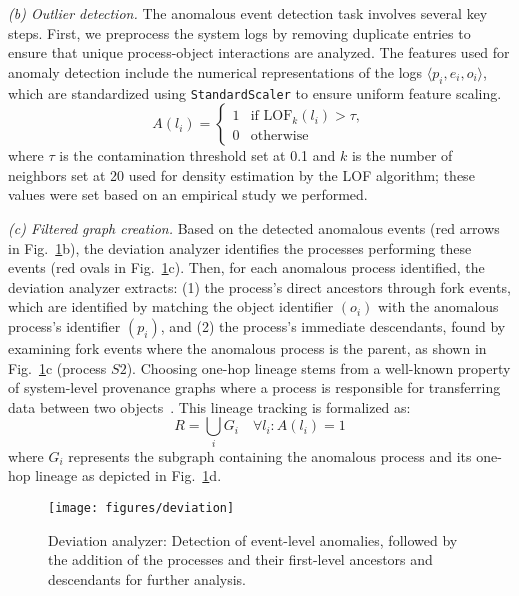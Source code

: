 \noindent\textit{(b) Outlier detection.} The anomalous event detection task involves several key steps. 
First, we preprocess the system logs by removing duplicate entries to ensure that unique process-object interactions are analyzed. 
The features used for anomaly detection include the numerical representations of the logs $\langle p_i, e_i, o_i \rangle$, which are standardized using \texttt{StandardScaler} to ensure uniform feature scaling.
\begin{equation}
A(l_i) =
\begin{cases}
1 & \text{if } \text{LOF}_k(l_i) > \tau, \\
0 & \text{otherwise}
\end{cases}
\end{equation}
where $\tau$ is the contamination threshold set at 0.1 and $k$ is the number of neighbors set at 20 used for density estimation by the LOF algorithm; these values were set based on an empirical study we performed.

\noindent\textit{(c) Filtered graph creation.} Based on the detected anomalous events (red arrows in Fig.~\ref{fig:deviation_analyzer}b), the deviation analyzer identifies the processes performing these events (red ovals in Fig.~\ref{fig:deviation_analyzer}c). 
Then, for each anomalous process identified, the deviation analyzer extracts: (1) the process's direct ancestors through fork events, which are identified by matching the object identifier $(o_i)$ with the anomalous process's identifier $(p_i)$, and (2) the process's immediate descendants, found by examining fork events where the anomalous process is the parent, as shown in Fig.~\ref{fig:deviation_analyzer}c (process $S2$).
Choosing one-hop lineage stems from a well-known property of system-level provenance graphs where a process is responsible for transferring data between two objects~\cite{inam2023sok}. 
This lineage tracking is formalized as:
\begin{equation}
R = \bigcup_{i} G_i \quad \forall l_i : A(l_i) = 1
\end{equation}
where $G_i$ represents the subgraph containing the anomalous process and its one-hop lineage as depicted in Fig.~\ref{fig:deviation_analyzer}d. \\

\begin{figure}[!t]
\centering
\texttt{[image: figures/deviation]}
\caption{Deviation analyzer: Detection of event-level anomalies, followed by the addition of the processes and their first-level ancestors and descendants for further analysis.}
\label{fig:deviation_analyzer}
\end{figure}

